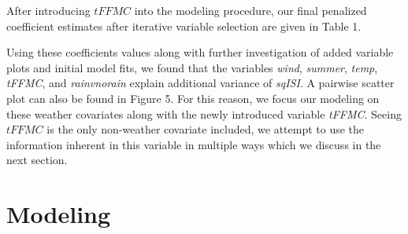 \documentclass{article}
\begin{document}
After introducing $tFFMC$ into the modeling procedure, our final penalized coefficient estimates after iterative variable selection are given in Table 1. 
\begin{figure}[h!]
\begin{floatrow}
\end{floatrow}
\end{figure}
Using these coefficients values along with further investigation of added variable plots and initial model fits, we found that the variables \textit{wind}, \textit{summer}, \textit{temp}, \textit{tFFMC}, and \textit{rainvnorain} explain additional variance of \textit{sqISI}. A pairwise scatter plot can also be found in Figure 5. For this reason, we focus our modeling on these weather covariates along with the newly introduced variable \textit{tFFMC}. Seeing $tFFMC$ is the only non-weather covariate included, we attempt to use the information inherent in this variable in multiple ways which we discuss in the next section. 

\section{Modeling}
\end{document}
